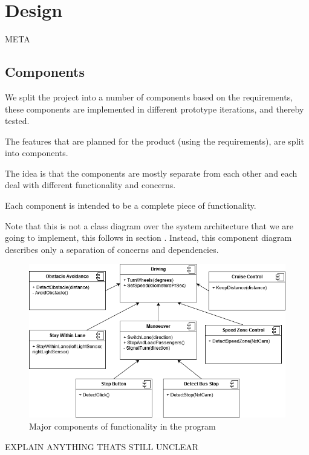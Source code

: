 \chapter{Design}
META

\section{Components}

We split the project into a number of components based on the requirements,  these components are implemented in different prototype iterations, and thereby tested. 



The features that are planned for the product (using the requirements), are split into components. 

The idea is that the components are mostly separate from each other and each deal with different functionality and concerns. 

Each component is intended to be a complete piece of functionality.

Note that this is not a class diagram over the system architecture that we are going to implement, this follows in section . Instead, this component diagram describes only a separation of concerns and dependencies.





\begin{figure}[h]
    \includegraphics[width=\textwidth]{Images/Design/componentDiagram.png}
    \caption{Major components of functionality in the program}
\end{figure}
EXPLAIN ANYTHING THATS STILL UNCLEAR

